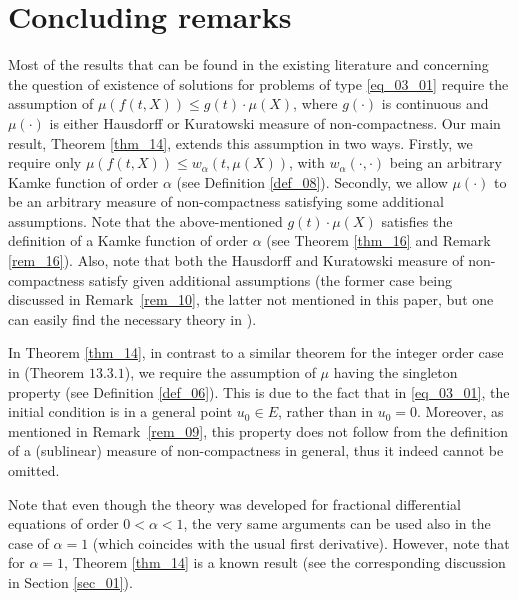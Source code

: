 \documentclass[reqno]{amsart}
\numberwithin{equation}{section}
\theoremstyle{definition}
\theoremstyle{remark}
\newcommand{\br}[1]{\left(#1\right)}
\newcommand{\definitionRef}[1]{\textrm{Definition \ref{#1}}}
\newcommand{\remarkRef}[1]{\textrm{Remark \,\ref{#1}}}
\newcommand{\sectionRef}[1]{\textrm{Section \ref{#1}}}
\newcommand{\theoremRef}[1]{\textrm{Theorem \ref{#1}}}
\begin{document}
	\section{Concluding remarks}\label{sec_05}
	\setcounter{section}{5}
	\setcounter{equation}{0}
	Most of the results that can be found in the existing literature and concerning the question of existence of solutions for problems of type \eqref{eq_03_01} require the assumption of $\mu\br{f\br{t,X}}\leq{g}\br{t}\cdot\mu\br{X}$, where $g\br{\cdot}$ is continuous and $\mu\br{\cdot}$ is either Hausdorff or Kuratowski measure of non-compactness. Our main result, \theoremRef{thm_14}, extends this assumption in two ways. Firstly, we require only $\mu\br{f\br{t,X}}\leq{w}_{\alpha}\br{t,\mu\br{X}}$, with $w_{\alpha}\br{\cdot,\cdot}$ being an arbitrary Kamke function of order $\alpha$ (see \definitionRef{def_08}). Secondly, we allow $\mu\br{\cdot}$ to be an arbitrary measure of non-compactness satisfying some additional assumptions. Note that the above-mentioned $g\br{t}\cdot\mu\br{X}$ satisfies the definition of a Kamke function of order $\alpha$ (see \theoremRef{thm_16} and \remarkRef{rem_16}). Also, note that both the Hausdorff and Kuratowski measure of non-compactness satisfy given additional assumptions (the former case being discussed in \remarkRef{rem_10}, the latter not mentioned in this paper, but one can easily find the necessary theory in \cite{Banas_book_sequences}).
	
	In \theoremRef{thm_14}, in contrast to a similar theorem for the integer order case in \cite{Banas_book} (Theorem $13.3.1$), we require the assumption of $\mu$ having the singleton property (see \definitionRef{def_06}). This is due to the fact that in \eqref{eq_03_01}, the initial condition is in a general point $u_0\in{E}$, rather than in $u_0=0$. Moreover, as mentioned in \remarkRef{rem_09}, this property does not follow from the definition of a (sublinear) measure of non-compactness in general, thus it indeed cannot be omitted.
	
	Note that even though the theory was developed for fractional differential equations of order $0<\alpha<1$, the very same arguments can be used also in the case of $\alpha=1$ (which coincides with the usual first derivative). However, note that for $\alpha=1$, \theoremRef{thm_14} is a known result (see the corresponding discussion in \sectionRef{sec_01}).
	
\end{document}
